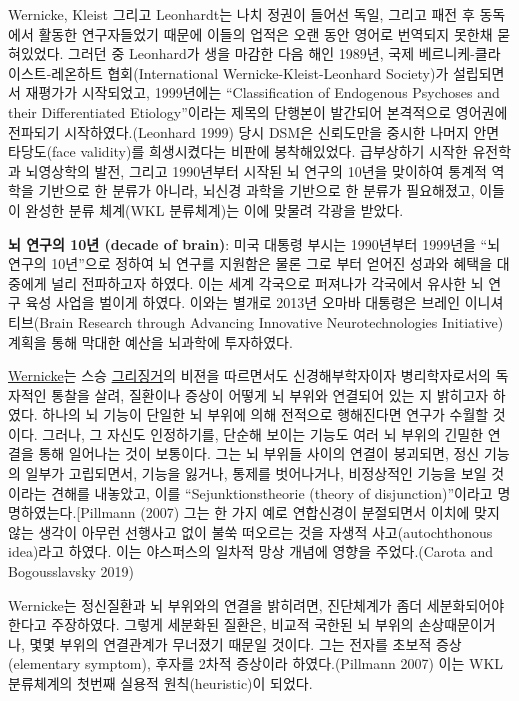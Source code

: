 \documentclass[
]{article}
\begin{document}
Wernicke, Kleist 그리고 Leonhardt는 나치 정권이 들어선 독일, 그리고 패전
후 동독에서 활동한 연구자들었기 때문에 이들의 업적은 오랜 동안 영어로
번역되지 못한채 묻혀있었다. 그러던 중 Leonhard가 생을 마감한 다음 해인
1989년, 국제 베르니케-클라이스트-레온하트 협회(International
Wernicke-Kleist-Leonhard Society)가 설립되면서 재평가가 시작되었고,
1999년에는 ``Classification of Endogenous Psychoses and their
Differentiated Etiology''이라는 제목의 단행본이 발간되어 본격적으로
영어권에 전파되기 시작하였다.(Leonhard 1999) 당시 DSM은 신뢰도만을
중시한 나머지 안면타당도(face validity)를 희생시켰다는 비판에
봉착해있었다. 급부상하기 시작한 유전학과 뇌영상학의 발전, 그리고
1990년부터 시작된 뇌 연구의 10년을 맞이하여 통계적 역학을 기반으로 한
분류가 아니라, 뇌신경 과학을 기반으로 한 분류가 필요해졌고, 이들이
완성한 분류 체계(WKL 분류체계)는 이에 맞물려 각광을 받았다.

\textbf{뇌 연구의 10년 (decade of brain)}: 미국 대통령 부시는 1990년부터
1999년을 ``뇌 연구의 10년''으로 정하여 뇌 연구를 지원함은 물론 그로 부터
얻어진 성과와 혜택을 대중에게 널리 전파하고자 하였다. 이는 세계 각국으로
퍼져나가 각국에서 유사한 뇌 연구 육성 사업을 벌이게 하였다. 이와는
별개로 2013년 오마바 대통령은 브레인 이니셔티브(Brain Research through
Advancing Innovative Neurotechnologies Initiative) 계획을 통해 막대한
예산을 뇌과학에 투자하였다.

\protect\hyperlink{bleuler}{Wernicke}는 스승
\protect\hyperlink{kraepelin}{그리징거}의 비젼을 따르면서도
신경해부학자이자 병리학자로서의 독자적인 통찰을 살려, 질환이나 증상이
어떻게 뇌 부위와 연결되어 있는 지 밝히고자 하였다. 하나의 뇌 기능이
단일한 뇌 부위에 의해 전적으로 행해진다면 연구가 수월할 것이다. 그러나,
그 자신도 인정하기를, 단순해 보이는 기능도 여러 뇌 부위의 긴밀한 연결을
통해 일어나는 것이 보통이다. 그는 뇌 부위들 사이의 연결이 붕괴되면, 정신
기능의 일부가 고립되면서, 기능을 잃거나, 통제를 벗어나거나, 비정상적인
기능을 보일 것이라는 견해를 내놓았고, 이를 ``Sejunktionstheorie (theory
of disjunction)''이라고 명명하였는다.{[}Pillmann (2007) 그는 한 가지
예로 연합신경이 분절되면서 이치에 맞지 않는 생각이 아무런 선행사고 없이
불쑥 떠오르는 것을 자생적 사고(autochthonous idea)라고 하였다. 이는
야스퍼스의 일차적 망상 개념에 영향을 주었다.(Carota and Bogousslavsky
2019)

Wernicke는 정신질환과 뇌 부위와의 연결을 밝히려면, 진단체계가 좀더
세분화되어야 한다고 주장하였다. 그렇게 세분화된 질환은, 비교적 국한된 뇌
부위의 손상때문이거나, 몇몇 부위의 연결관계가 무너졌기 때문일 것이다.
그는 전자를 초보적 증상(elementary symptom), 후자를 2차적 증상이라
하였다.(Pillmann 2007) 이는 WKL 분류체계의 첫번째 실용적
원칙(heuristic)이 되었다.
\end{document}
